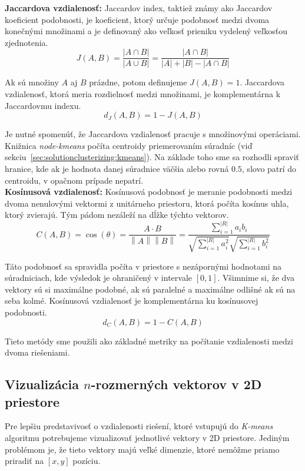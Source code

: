 \noindent\textbf{Jaccardova vzdialenosť:} Jaccardov index, taktiež známy ako Jaccardov
koeficient podobnosti, je koeficient, ktorý určuje podobnosť medzi dvoma konečnými množinami
a je definovaný ako veľkosť prieniku vydelený veľkosťou zjednotenia.
$$J(A,B) = \frac{|A\cap B|}{|A\cup B|} = \frac{|A\cap B|}{|A| + |B| - |A\cap B|}$$

Ak sú množiny $A$ aj $B$ prázdne, potom definujeme $J(A,B) = 1$.
Jaccardova vzdialenosť, ktorá meria rozdielnosť medzi množinami, je komplementárna
k Jaccardovmu indexu.
$$d_J(A,B) = 1 - J(A,B)$$

Je nutné spomenúť, že Jaccardova vzdialenosť pracuje s množinovými operáciami. Knižnica
\textit{node-kmeans} počíta centroidy priemerovaním súradníc
(viď sekciu~\ref{sec:solutionclusterizing:kmeans}). Na základe toho sme sa rozhodli
spraviť hranice, kde ak je hodnota danej súradnice väčšia alebo rovná $0.5$, slovo
patrí do centroidu, v opačnom prípade nepatrí.\\

\noindent\textbf{Kosínusová vzdialenosť:} Kosínusová podobnosť je meranie podobnosti
medzi dvoma nenulovými vektormi z unitárneho priestoru, ktorá počíta kosínus uhla,
ktorý zvierajú. Tým pádom nezáleží na dĺžke týchto vektorov.
$$C(A,B)=\cos(\theta)=
\frac{A\cdot B}{\left\lVert A \right\rVert \left\lVert B \right\rVert}=
\frac{\displaystyle \sum_{i=1}^{|R|} a_ib_i}{\sqrt{\displaystyle \sum_{i=1}^{|R|} a_i^2} \sqrt{\displaystyle \sum_{i=1}^{|R|} b_i^2}}$$

Táto podobnosť sa spravidla počíta v priestore s nezápornými hodnotami na súradniciach,
kde výsledok je ohraničený v intervale $[0,1]$. Všimnime si, že dva vektory sú si
maximálne podobné, ak sú paralelné a maximálne odlišné ak sú na seba kolmé.
Kosínusová vzdialenosť je komplementárna ku kosínusovej podobnosti.
$$d_C(A,B)=1-C(A,B)$$

Tieto metódy sme použili ako základné metriky na počítanie vzdialenosti medzi
dvoma riešeniami.

\subsection{Vizualizácia $n$-rozmerných vektorov v 2D priestore}
\label{sec:solutionclusterizing:tsne}

Pre lepšiu predstavivosť o vzdialenosti riešení, ktoré vstupujú do \textit{K-means}
algoritmu potrebujeme vizualizovať jednotlivé vektory v 2D priestore. Jediným
problémom je, že tieto vektory majú veľké dimenzie, ktoré nemôžme priamo priradiť
na $[x,y]$ pozíciu.

